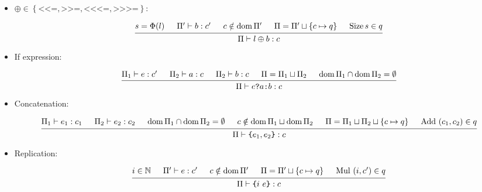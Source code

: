 \documentclass{article}
\DeclareMathOperator{\dom}{dom}
\DeclareMathOperator{\Size}{Size}
\DeclareMathOperator{\Add}{Add}
\DeclareMathOperator{\Mul}{Mul}
\newcommand{\assignShift}{\ensuremath{\left\{
      \texttt{<}\texttt{<=}, \texttt{>>=},
      \texttt{<}\texttt{<}\texttt{<=}, \texttt{>>>=}
    \right\}}}
\begin{document}
\begin{itemize}[leftmargin=*]
    \item $\oplus \in \assignShift$:

          \begin{equation*}
              \begin{prooftree}
                  \hypo{s = \Phi(l)}
                  \hypo{\Pi' \vdash b: c'}
                  \hypo{c \notin \dom \Pi'}
                  \hypo{\Pi = \Pi' \sqcup \left\{c \mapsto q\right\}}
                  \hypo{\Size s \in q}
                  \infer5{\Pi \vdash l \oplus b: c}
              \end{prooftree}
          \end{equation*}


    \item If expression:

          \begin{equation*}
              \begin{prooftree}
                  \hypo{\Pi_1 \vdash e: c'}
                  \hypo{\Pi_2 \vdash a: c}
                  \hypo{\Pi_2 \vdash b: c}
                  \hypo{\Pi = \Pi_1 \sqcup \Pi_2}
                  \hypo{\dom \Pi_1 \cap \dom \Pi_2 = \emptyset}
                  \infer5{\Pi \vdash e \texttt{?} a \texttt{:} b: c}
              \end{prooftree}
          \end{equation*}


    \item Concatenation:

          \begin{equation*}
              \begin{prooftree}
                  \hypo{\Pi_1 \vdash e_1: c_1}
                  \hypo{\Pi_2 \vdash e_2: c_2}
                  \hypo{\dom \Pi_1 \cap \dom \Pi_2 = \emptyset}
                  \hypo{c \notin \dom \Pi_1 \sqcup \dom \Pi_2}
                  \hypo{\Pi = \Pi_1 \sqcup \Pi_2 \sqcup \left\{c \mapsto q\right\}}
                  \hypo{\Add~(c_1, c_2) \in q}
                  \infer6{\Pi \vdash \texttt{\{}e_1, e_2 \texttt{\}}: c}
              \end{prooftree}
          \end{equation*}


    \item Replication:

          \begin{equation*}
              \begin{prooftree}
                  \hypo{i \in \mathbb{N}}
                  \hypo{\Pi' \vdash e: c'}
                  \hypo{c \notin \dom \Pi'}
                  \hypo{\Pi = \Pi' \sqcup \left\{c \mapsto q\right\}}
                  \hypo{\Mul~(i, c') \in q}
                  \infer5{\Pi \vdash \texttt{\{}i~e\texttt{\}}: c}
              \end{prooftree}
          \end{equation*}



\end{itemize}
\end{document}
